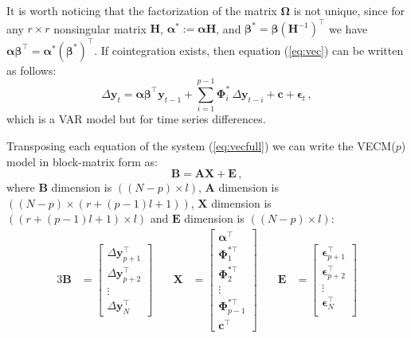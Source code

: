 It is worth noticing that the factorization of the matrix
$\boldsymbol\Omega$ is not unique, since for any $r \times r$
nonsingular matrix $\mathbf{H}$, $\boldsymbol{\alpha}^*:=\boldsymbol{\alpha}\mathbf{H}$,
and $\boldsymbol{\beta}^*=\boldsymbol{\beta}(\mathbf{H}^{-1})^\top$ we have
$\boldsymbol{\alpha\beta}^\top=\boldsymbol{\alpha}^*(\boldsymbol{\beta}^*)^\top$.
If cointegration exists, then equation (\ref{eq:vec}) can be written
as follows:
\begin{equation}\label{eq:vecfull}
\Delta\mathbf{y}_t 
= \boldsymbol{\alpha\beta}^\top\mathbf{y}_{t-1} 
  + \sum_{i=1}^{p-1}\boldsymbol{\Phi}_i^*\,\Delta\mathbf{y}_{t-i}
  + \mathbf{c} + \boldsymbol{\epsilon}_t\,,
\end{equation}
\noindent
which is a VAR model but for time series differences.


Transposing each equation of the system (\ref{eq:vecfull}) we can write
the VECM($p$) model in block-matrix form as:
\begin{equation}\label{eq:vareq}
\mathbf{B} = 
\mathbf{A} \mathbf{X} + 
\mathbf{E} \, , 
\end{equation}
%
\noindent where $\mathbf{B}$ dimension is $((N-p)\times l)$, $\mathbf{A}$
dimension is $((N-p)\times(r+(p-1)l +1))$, $\mathbf{X}$ dimension is $((r+(p-1)l
+1)\times l)$ and $\mathbf{E}$ dimension is $((N-p)\times l)$:
%
\begin{alignat}{3}
\mathbf{B}
&= \begin{bmatrix}
   \Delta\mathbf{y}_{p+1}^\top \\
   \Delta\mathbf{y}_{p+2}^\top \\
   \vdots \\
   \Delta\mathbf{y}_N^\top
   \end{bmatrix}
&\quad
\mathbf{X}
&= \begin{bmatrix}
   \boldsymbol{\alpha}^\top \\
   \boldsymbol{\Phi}_1^{*\top} \\
   \boldsymbol{\Phi}_2^{*\top} \\
   \vdots \\
   \boldsymbol{\Phi}_{p-1}^{*\top} \\
   \mathbf{c}^\top
   \end{bmatrix}
&\quad
\mathbf{E}
&= \begin{bmatrix}
   \boldsymbol{\epsilon}_{p+1}^\top \\
   \boldsymbol{\epsilon}_{p+2}^\top \\
   \vdots \\
   \boldsymbol{\epsilon}_N^\top \\
   \end{bmatrix}
\end{alignat}
